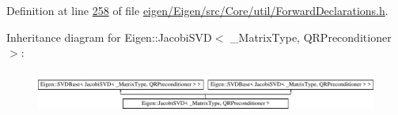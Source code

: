 Definition at line \hyperlink{eigen_2_eigen_2src_2_core_2util_2_forward_declarations_8h_source_l00258}{258} of file \hyperlink{eigen_2_eigen_2src_2_core_2util_2_forward_declarations_8h_source}{eigen/\+Eigen/src/\+Core/util/\+Forward\+Declarations.\+h}.

Inheritance diagram for Eigen\+:\+:Jacobi\+S\+VD$<$ \+\_\+\+Matrix\+Type, Q\+R\+Preconditioner $>$\+:\begin{figure}[H]
\begin{center}
\leavevmode
\includegraphics[height=1.386139cm]{group___s_v_d___module}
\end{center}
\end{figure}
